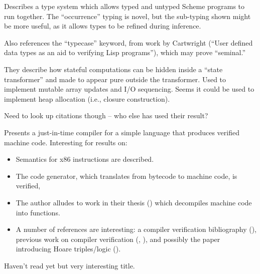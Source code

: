 \documentclass[11pt]{article}
\begin{document}

Describes a type system which allows typed and untyped Scheme programs
to run together. The ``occurrence'' typing is novel, but the
sub-typing shown might be more useful, as it allows types to be refined
during inference.

Also references the ``typecase'' keyword, from work by Cartwright
(``User defined data types as an aid to verifying Lisp programs''), which may
prove ``seminal.''


They describe how stateful computations can be hidden inside a ``state
transformer'' and made to appear pure outside the transformer. Used to
implement mutable array updates and I/O sequencing. Seems it could be
used to implement heap allocation (i.e., closure construction).

Need to look up citations though -- who else has used their result?


Presents a just-in-time compiler for a simple language that 
produces verified machine code. Interesting for results on:

\begin{itemize}
\item Semantics for x86 instructions are described.
\item The code generator, which translates from bytecode to machine code,
is verified,
\item The author alludes to work in their thesis (\cite{Myreen09Formal}) which
decompiles machine code into functions.
\item A number of references are interesting: a compiler verification
  bibliography (\cite{Dave03Compiler}), previous work on compiler verification (\cite{Myreen09Extensible},
  \cite{Myreen08Machine}), and possibly the paper introducing Hoare triples/logic (\cite{Hoare69Axiomatic}).
 
\end{itemize}


Haven't read yet but very interesting title.
\end{document}
